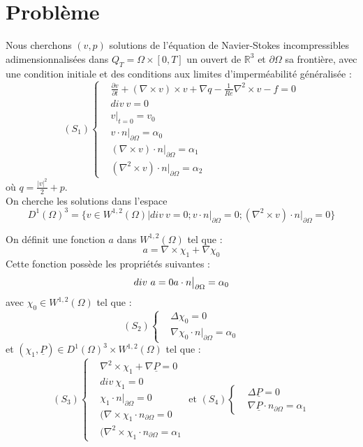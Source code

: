 \documentclass[a4paper,11pt]{article} %
\newcommand{\R}{{\mathbb{R}}}
\begin{document}
\section{Probl\`eme}
Nous cherchons $(v,p)$ solutions de l'\'equation de Navier-Stokes incompressibles adimensionnalis\'ees dans $Q_T=\Omega\times[0,T]$ un ouvert de $\R^3$ et $\partial\Omega$ sa fronti\`ere, avec une condition initiale et des conditions aux limites d'imperm\'eabilit\'e g\'en\'eralis\'ee :
\[
(S_1)
\left\{
\begin{aligned}
&\frac{\partial v}{\partial t} + (\nabla\times v)\times v + \nabla q -\frac{1}{Re}\nabla^2\times v-f = 0\\
&div\ v = 0\\
&v\big\rvert_{t=0} = v_0\\
&v\cdot n\big\rvert_{\partial\Omega} = \alpha_0\\
&(\nabla\times v)\cdot n\big\rvert_{\partial\Omega} = \alpha_1\\
&(\nabla^2\times v)\cdot n\big\rvert_{\partial\Omega} = \alpha_2
\end{aligned}
\right.
\]
o\`u $q = \frac{|v|^2}{2}+p$.\\

On cherche les solutions dans l'espace
\[
D^1(\Omega)^3 = \{v\in W^{1,2}(\Omega) | div\ v=0;v\cdot n\big\rvert_{\partial\Omega}=0; (\nabla^2\times v) \cdot n\big\rvert_{\partial\Omega}=0\}
\]

On d\'efinit une fonction $a$ dans $W^{1,2}(\Omega)$ tel que :
\[
a=\nabla\times\chi_1+\nabla\chi_0
\]
Cette fonction poss\`ede les propri\'et\'es suivantes :
\[
div\ a =0\\
a\cdot n\big\rvert_{\partial\Omega} = \alpha_0
\]
avec $\chi_0\in W^{1,2}(\Omega)$ tel que :
\[
(S_2)\left\{
\begin{aligned}
&\Delta\chi_0 = 0\\
&\nabla\chi_0\cdot n\big\rvert_{\partial\Omega}=\alpha_0
\end{aligned}
\right.
\]
et $(\chi_1,\underline{P})\in D^1(\Omega)^3\times W^{1,2}(\Omega)$ tel que :
\[
(S_3)\left\{
\begin{aligned}
&\nabla^2\times\chi_1 + \nabla\underline{P} = 0\\
&div\ \chi_1 = 0\\
&\chi_1\cdot n\big\rvert_{\partial\Omega} = 0\\
&(\nabla\times\chi_1\cdot n_{\partial\Omega} = 0\\
&(\nabla^2\times\chi_1\cdot n_{\partial\Omega} = \alpha_1
\end{aligned}
\right.
\text{ et }
(S_4)\left\{
\begin{aligned}
&\Delta\underline{P} = 0\\
&\nabla\underline{P}\cdot n_{\partial\Omega} = \alpha_1
\end{aligned}
\right.
\]
\end{document}
